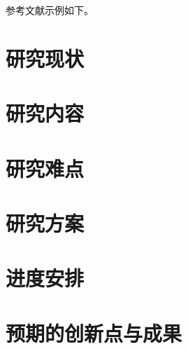 \documentclass[a4paper,12pt]{NPUResearchProposal}
\begin{document}
参考文献示例如下\citep{rudin1964principles}。
\section{研究现状}
\label{sec:current_state}
\section{研究内容}
\label{sec:contents_research}
\section{研究难点}
\label{sec:keypoints}
\section{研究方案}
\label{sec:roadmap}
\section{进度安排}
\section{预期的创新点与成果}

\end{document}
